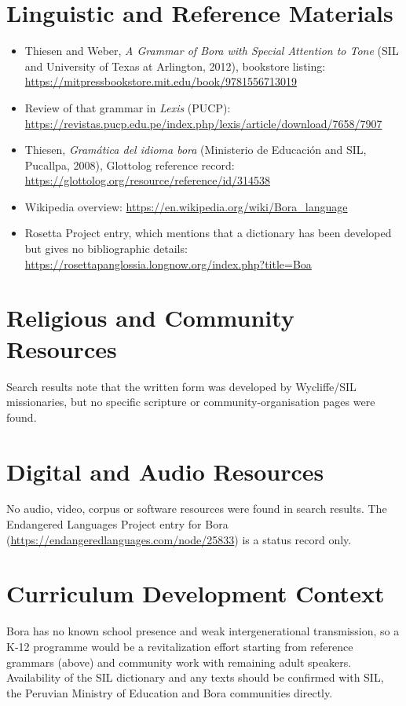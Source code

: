 \documentclass[12pt]{article}
\begin{document}
\section{Linguistic and Reference Materials}
\begin{itemize}
\item Thiesen and Weber, \emph{A Grammar of Bora with Special Attention to Tone} (SIL and University of Texas at Arlington, 2012), bookstore listing: \url{https://mitpressbookstore.mit.edu/book/9781556713019}
\item Review of that grammar in \emph{Lexis} (PUCP): \url{https://revistas.pucp.edu.pe/index.php/lexis/article/download/7658/7907}
\item Thiesen, \emph{Gram\'atica del idioma bora} (Ministerio de Educaci\'on and SIL, Pucallpa, 2008), Glottolog reference record: \url{https://glottolog.org/resource/reference/id/314538}
\item Wikipedia overview: \url{https://en.wikipedia.org/wiki/Bora_language}
\item Rosetta Project entry, which mentions that a dictionary has been developed but gives no bibliographic details: \url{https://rosettapanglossia.longnow.org/index.php?title=Boa}
\end{itemize}

\section{Religious and Community Resources}
Search results note that the written form was developed by Wycliffe/SIL missionaries, but no specific scripture or community-organisation pages were found.

\section{Digital and Audio Resources}
No audio, video, corpus or software resources were found in search results. The Endangered Languages Project entry for Bora (\url{https://endangeredlanguages.com/node/25833}) is a status record only.

\section{Curriculum Development Context}
Bora has no known school presence and weak intergenerational transmission, so a K-12 programme would be a revitalization effort starting from reference grammars (above) and community work with remaining adult speakers. Availability of the SIL dictionary and any texts should be confirmed with SIL, the Peruvian Ministry of Education and Bora communities directly.
\end{document}
